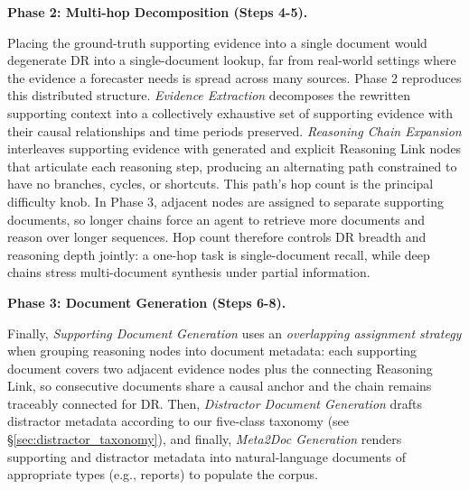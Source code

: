 \documentclass[]{servicenow}
\DeclareRobustCommand{\stagecircle}[1]{%
  \tikz[baseline=-0.55ex]{
    \node[
      circle,
      fill=stagegreen,
      text=white,
      font=\bfseries\scriptsize,
      inner sep=0pt,
      minimum size=1.em
    ] {#1};
  }%
}
\newcommand{\paragraphtight}[1]{%
  \par\vspace{-0.75\parskip}\vspace{0.3em}%
  \noindent\textbf{#1}\hspace{0.4em}\ignorespaces
}
\begin{document}
\paragraphtight{Phase 2: Multi-hop Decomposition (Steps 4-5).}
Placing the ground-truth supporting evidence into a single document would degenerate DR into a single-document lookup, far from real-world settings where the evidence a forecaster needs is spread across many sources. Phase 2 reproduces this distributed structure.
\stagecircle{4} \emph{Evidence Extraction} decomposes the rewritten supporting context into a collectively exhaustive set of supporting evidence with their causal relationships and time periods preserved. 
\stagecircle{5} \emph{Reasoning Chain Expansion} interleaves supporting evidence with generated and explicit Reasoning Link nodes that articulate each reasoning step, producing an alternating path constrained to have no branches, cycles, or shortcuts. 
This path's hop count is the principal difficulty knob. In Phase 3, adjacent nodes are assigned to separate supporting documents, so longer chains force an agent to retrieve more documents and reason over longer sequences. Hop count therefore controls DR breadth and reasoning depth jointly: a one-hop task is single-document recall, while deep chains stress multi-document synthesis under partial information.










\paragraphtight{Phase 3: Document Generation (Steps 6-8).}
Finally, \stagecircle{6} \emph{Supporting Document Generation} uses an \emph{overlapping assignment strategy} when grouping reasoning nodes into document metadata: each supporting document covers two adjacent evidence nodes plus the connecting Reasoning Link, so consecutive documents share a causal anchor and the chain remains traceably connected for DR. 
Then, \stagecircle{7} \emph{Distractor Document Generation} drafts distractor metadata according to our five-class taxonomy (see \S\ref{sec:distractor_taxonomy}), and finally, \stagecircle{8} \emph{Meta2Doc Generation} renders supporting and distractor metadata into natural-language documents of appropriate types (e.g., reports) to populate the corpus.
\end{document}
